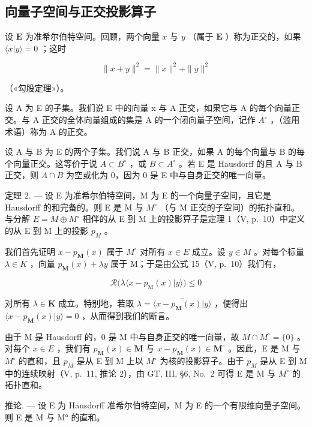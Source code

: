 \subsection{向量子空间与正交投影算子}

设 \(\mathbf{E}\) 为准希尔伯特空间。回顾，两个向量 \(x\) 与 \(y\) （属于 \(\mathbf{E}\) ）称为正交的，如果 \(\langle x|y\rangle = 0\) ；这时

\[
\| x + y \| ^ {2} = \| x \| ^ {2} + \| y \| ^ {2}\tag{16}
\]

（«勾股定理»）。

设 A 为 E 的子集。我们说 E 中的向量 x 与 A 正交，如果它与 A 的每个向量正交。与 A 正交的全体向量组成的集是 A 的一个闭向量子空间，记作 \(A^{\circ}\) ，（滥用术语）称为 A 的正交。

设 A 与 B 为 E 的两个子集。我们说 A 与 B 正交，如果 A 的每个向量与 B 的每个向量正交。这等价于说 \(A \subset B^{\circ}\) ，或 \(B \subset A^{\circ}\) 。若 E 是 Hausdorff 的且 A 与 B 正交，则 \(A \cap B\) 为空或化为 0，因为 0 是 E 中与自身正交的唯一向量。

定理 2. --- 设 E 为准希尔伯特空间，M 为 E 的一个向量子空间，且它是 Hausdorff 的和完备的。则 E 是 M 与 \(M^{\circ}\) （与 M 正交的子空间）的拓扑直和。与分解 \(E = M \oplus M^{\circ}\) 相伴的从 E 到 M 上的投影算子是定理 1（V, p.~10）中定义的从 E 到 M 上的投影 \(p_{M}\) 。

我们首先证明 \(x - p_{\mathbf{M}}(x)\) 属于 \(M^{\circ}\) 对所有 \(x \in E\) 成立。设 \(y \in M\) 。对每个标量 \(\lambda \in K\) ，向量 \(p_{\mathbf{M}}(x) + \lambda y\) 属于 M；于是由公式 15（V, p.~10）我们有，

\[
\mathcal {R} \big (\lambda \langle x - p _ {\mathrm{M}} (x) | y \rangle \big) \leqslant 0
\]

对所有 \(\lambda \in \mathbf{K}\) 成立。特别地，若取 \(\lambda = \overline{\langle x - p_{\mathbf{M}}(x)|y\rangle}\) ，便得出 \(\langle x - p_{\mathbf{M}}(x)|y\rangle = 0\) ，从而得到我们的断言。

由于 M 是 Hausdorff 的，0 是 M 中与自身正交的唯一向量，故 \(M \cap M^{\circ} = \{0\}\) 。对每个 \(x \in E\) ，我们有 \(p_{\mathbf{M}}(x) \in \mathbf{M}\) 与 \(x - p_{\mathbf{M}}(x) \in \mathbf{M}^{\circ}\) 。因此，E 是 M 与 \(M^{\circ}\) 的直和，且 \(p_{M}\) 是从 E 到 M 上以 \(M^{\circ}\) 为核的投影算子。由于 \(p_{M}\) 是从 E 到 M 中的连续映射（V, p.~11, 推论 2），由 GT, III, §6, No.~2 可得 E 是 M 与 \(M^{\circ}\) 的拓扑直和。

推论. --- 设 E 为 Hausdorff 准希尔伯特空间，M 为 E 的一个有限维向量子空间。则 E 是 M 与 M° 的直和。


